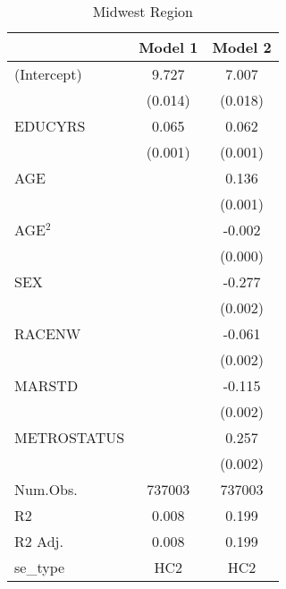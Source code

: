 \documentclass[12pt, English]{article}
\begin{document}
\begin{table}
\centering %
    \caption{Midwest Region}
    \vspace{7.5mm} %
\begin{tabular}[t]{lcc}
\toprule
& Model 1 & Model 2\\
\midrule
(Intercept) & 9.727 & 7.007\\
 & (0.014) & (0.018)\\
EDUCYRS & 0.065 & 0.062\\
 & (0.001) & (0.001)\\
AGE &  & 0.136\\
 &  & (0.001)\\
AGE$^2$ &  & -0.002\\
 &  & (0.000)\\
SEX &  & -0.277\\
 &  & \vphantom{3} (0.002)\\
RACENW &  & -0.061\\
 &  & \vphantom{2} (0.002)\\
MARSTD &  & -0.115\\
 &  & \vphantom{1} (0.002)\\
METROSTATUS &  & 0.257\\
 &  & (0.002)\\
\midrule
Num.Obs. & 737003 & 737003\\
R2 & 0.008 & 0.199\\
R2 Adj. & 0.008 & 0.199\\
se\_type & HC2 & HC2\\
\bottomrule
\end{tabular}
\end{table}


\newpage
\end{document}
